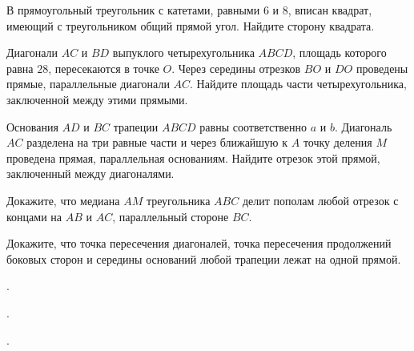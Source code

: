 %
%

\begin{class}[number=1]
	\begin{listofex}
		\item В прямоугольный треугольник с катетами, равными \(6\) и 8, вписан квадрат, имеющий с треугольником общий прямой угол. Найдите сторону квадрата.
		\item Диагонали \(AC\) и \(BD \) выпуклого четырехугольника \(ABCD\), площадь которого равна \(28\), пересекаются в точке \(O\). Через середины отрезков \(BO\) и \(DO\) проведены прямые, параллельные диагонали \(AC\). Найдите площадь части четырехугольника, заключенной между этими прямыми.
		\item Основания \(AD\) и \(BC\) трапеции \(ABCD\) равны соответственно \(a\) и \(b\). Диагональ \(AC\) разделена на три равные части и через ближайшую к \(A\) точку деления \(M\) проведена прямая, параллельная основаниям. Найдите отрезок этой прямой, заключенный между диагоналями.
		\item Докажите, что медиана \(AM\) треугольника \(ABC\) делит пополам любой отрезок с концами на \(AB\) и \(AC\), параллельный стороне \(BC\). 
		\item Докажите, что точка пересечения диагоналей, точка пересечения продолжений боковых сторон и середины оснований любой трапеции лежат на одной прямой.
	\end{listofex}
\end{class}

\begin{class}[number=2]
	\begin{listofex}
		\item .
	\end{listofex}
\end{class}

\begin{homework}[number=1]
	\begin{listofex}
		\item .
	\end{listofex}
\end{homework}

\begin{class}[number=3]
	\begin{listofex}
		\item .
	\end{listofex}
\end{class}

